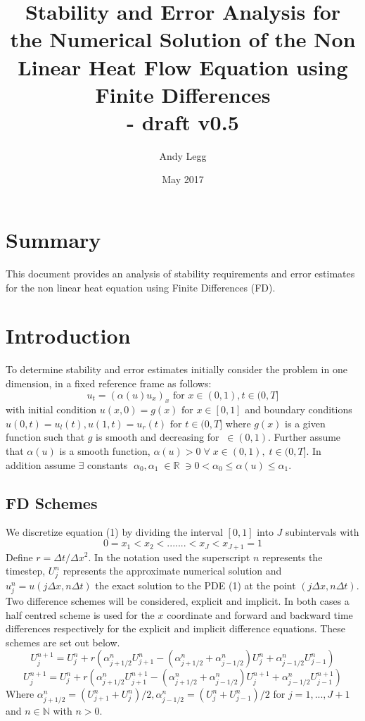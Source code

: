 \documentclass[11pt]{article}
\title{Stability and Error Analysis for the Numerical Solution of the Non Linear Heat Flow Equation using Finite Differences\\ - draft v0.5}
\author{Andy Legg}
\date{May 2017}
\begin{document}
\maketitle
\section{Summary}
This document provides an analysis of stability requirements and error estimates for the non linear heat equation using Finite Differences (FD).
\section{Introduction}
To determine stability and error estimates initially consider the problem in one dimension, in a fixed reference frame as follows: 
\begin{equation}
\label{eq:pde}
u_t = (\alpha(u)u_x)_x \text{ for } x \in (0,1), t\in (0,T]
\end{equation}
with initial condition $u(x,0) = g(x) \text { for } x\in [0,1] $ and boundary conditions $u(0,t) = u_l(t), u(1,t)= u_r(t) \text{ for } t \in(0,T]$ where $g(x) $ is a given function such that $g$ is smooth and decreasing for $\ \in (0,1)$. Further assume that $\alpha(u)$ is a smooth function, $\alpha(u) > 0 \;\forall\; x\in(0,1), \;t\in (0,T]$. In addition assume $\exists $ constants $\;\alpha_{0}, \alpha_{1} \; \in \mathbb{R}\; \ni  0 < \alpha_{0}\leq\alpha(u)\leq\alpha_{1}$. 
\subsection{FD Schemes}
We discretize equation (1) by dividing the interval $[0,1]$ into $J$ subintervals with $$0 = x_1<x_2<.......<x_J<x_{J+1}=1$$ 
Define $r = \Delta{t}/\Delta{x}^2$. In the notation used the superscript $n$ represents the timestep, $U_j^n$ represents the approximate numerical solution and $u_j^n = u(j\Delta{x}, n\Delta{t})$ the exact solution to the PDE (1) at the point $(j\Delta{x}, n\Delta{t})$. Two difference schemes will be considered, explicit and implicit. In both cases a half centred scheme is used for the $x$ coordinate and forward and backward time differences respectively for the explicit and implicit difference equations. These schemes are set out below.
\begin{equation}
\label{eq:expdiff}
U_j^{n+1} = U_j^n + r(\alpha_{j+1/2}^nU_{j+1}^n - (\alpha_{j+1/2}^n+\alpha_{j-1/2}^n)U_j^n+\alpha_{j-1/2}^nU_{j-1}^n)
\end{equation}
\begin{equation}
\label{eq:impdiff}
U_j^{n+1} = U_j^n + r(\alpha_{j+1/2}^nU_{j+1}^{n+1} - (\alpha_{j+1/2}^n+\alpha_{j-1/2}^n)U_j^{n+1}+\alpha_{j-1/2}^nU_{j-1}^{n+1})
\end{equation}
Where  $ \alpha^n_{j+1/2} = ( U^n_{j+1}+U^n_j)/2, \alpha^n_{j-1/2} = ( U^n_{j}+U^n_{j-1})/2$ for $j = 1,...,J+1$ and $ n \in \mathbb{N}$ with $n > 0$.
%
%
\end{document}
